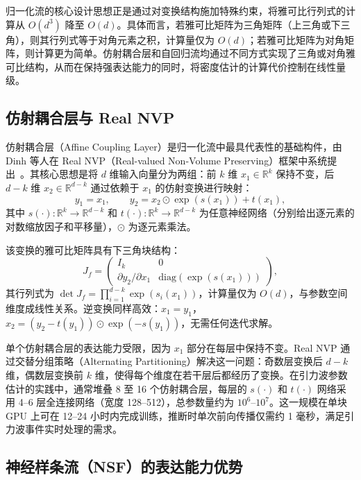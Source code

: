归一化流的核心设计思想正是通过对变换结构施加特殊约束，将雅可比行列式的计算从 $O(d^3)$ 降至 $O(d)$。具体而言，若雅可比矩阵为三角矩阵（上三角或下三角），则其行列式等于对角元素之积，计算量仅为 $O(d)$；若雅可比矩阵为对角矩阵，则计算更为简单。仿射耦合层和自回归流均通过不同方式实现了三角或对角雅可比结构，从而在保持强表达能力的同时，将密度估计的计算代价控制在线性量级。

\subsection{仿射耦合层与 Real NVP}

仿射耦合层（Affine Coupling Layer）是归一化流中最具代表性的基础构件，由 Dinh 等人在 Real NVP（Real-valued Non-Volume Preserving）框架中系统提出~\cite{Dinh2017RealNVP}。其核心思想是将 $d$ 维输入向量分为两组：前 $k$ 维 $x_1 \in \mathbb{R}^k$ 保持不变，后 $d-k$ 维 $x_2 \in \mathbb{R}^{d-k}$ 通过依赖于 $x_1$ 的仿射变换进行映射：
\begin{equation}
  y_1 = x_1, \qquad y_2 = x_2 \odot \exp\!\left(s(x_1)\right) + t(x_1),
\end{equation}
其中 $s(\cdot): \mathbb{R}^k \to \mathbb{R}^{d-k}$ 和 $t(\cdot): \mathbb{R}^k \to \mathbb{R}^{d-k}$ 为任意神经网络（分别给出逐元素的对数缩放因子和平移量），$\odot$ 为逐元素乘法。

该变换的雅可比矩阵具有下三角块结构：
\begin{equation}
  J_f = \begin{pmatrix} I_k & 0 \\ \partial y_2/\partial x_1 & \mathrm{diag}(\exp(s(x_1))) \end{pmatrix},
\end{equation}
其行列式为 $\det J_f = \prod_{i=1}^{d-k} \exp(s_i(x_1))$，计算量仅为 $O(d)$，与参数空间维度成线性关系。逆变换同样高效：$x_1 = y_1$，$x_2 = (y_2 - t(y_1)) \odot \exp(-s(y_1))$，无需任何迭代求解。

单个仿射耦合层的表达能力受限，因为 $x_1$ 部分在每层中保持不变。Real NVP 通过交替分组策略（Alternating Partitioning）解决这一问题：奇数层变换后 $d-k$ 维，偶数层变换前 $k$ 维，使得每个维度在若干层后都经历了变换。在引力波参数估计的实践中，通常堆叠 8 至 16 个仿射耦合层，每层的 $s(\cdot)$ 和 $t(\cdot)$ 网络采用 4--6 层全连接网络（宽度 128--512），总参数量约为 $10^6$--$10^7$。这一规模在单块 GPU 上可在 12--24 小时内完成训练，推断时单次前向传播仅需约 1 毫秒，满足引力波事件实时处理的需求。

\subsection{神经样条流（NSF）的表达能力优势}

